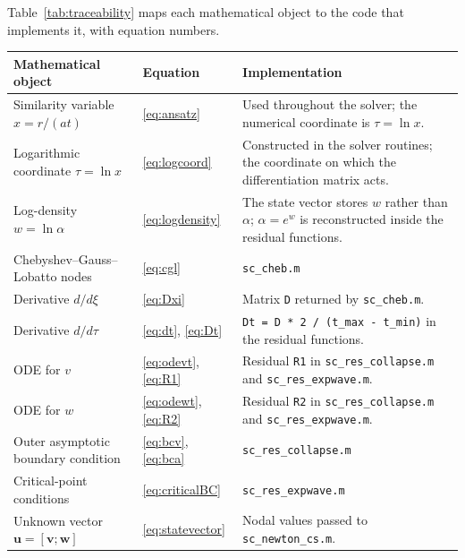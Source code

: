 \documentclass[11pt,a4paper]{article}
\begin{document}
Table~\ref{tab:traceability} maps each mathematical object to the code
that implements it, with equation numbers.

\begin{table}[H]
\centering
\renewcommand{\arraystretch}{1.35}
\begin{tabular}{@{}p{4.6cm}p{2.2cm}p{7.4cm}@{}}
\toprule
\textbf{Mathematical object} & \textbf{Equation} & \textbf{Implementation} \\
\midrule

Similarity variable $x=r/(at)$
& \eqref{eq:ansatz}
&
Used throughout the solver; the numerical coordinate is
$\tau=\ln x$.
\\

Logarithmic coordinate $\tau=\ln x$
& \eqref{eq:logcoord}
&
Constructed in the solver routines; the coordinate on which the
differentiation matrix acts.
\\

Log-density $w=\ln\alpha$
& \eqref{eq:logdensity}
&
The state vector stores $w$ rather than $\alpha$; $\alpha=e^w$ is
reconstructed inside the residual functions.
\\

Chebyshev--Gauss--Lobatto nodes
& \eqref{eq:cgl}
&
\texttt{sc\_cheb.m} \cite{trefethen2000}
\\

Derivative $d/d\xi$
& \eqref{eq:Dxi}
&
Matrix \texttt{D} returned by \texttt{sc\_cheb.m}.
\\

Derivative $d/d\tau$
& \eqref{eq:dt}, \eqref{eq:Dt}
&
\texttt{Dt = D * 2 / (t\_max - t\_min)} in the residual functions.
\\

ODE for $v$
& \eqref{eq:odevt}, \eqref{eq:R1}
&
Residual \texttt{R1} in \texttt{sc\_res\_collapse.m} and
\texttt{sc\_res\_expwave.m}.
\\

ODE for $w$
& \eqref{eq:odewt}, \eqref{eq:R2}
&
Residual \texttt{R2} in \texttt{sc\_res\_collapse.m} and
\texttt{sc\_res\_expwave.m}.
\\

Outer asymptotic boundary condition
& \eqref{eq:bcv}, \eqref{eq:bca}
&
\texttt{sc\_res\_collapse.m}
\\

Critical-point conditions
& \eqref{eq:criticalBC}
&
\texttt{sc\_res\_expwave.m}
\\

Unknown vector $\mathbf u=[\mathbf v;\mathbf w]$
& \eqref{eq:statevector}
&
Nodal values passed to \texttt{sc\_newton\_cs.m}.
\\


\end{tabular}
\end{table}
\end{document}
